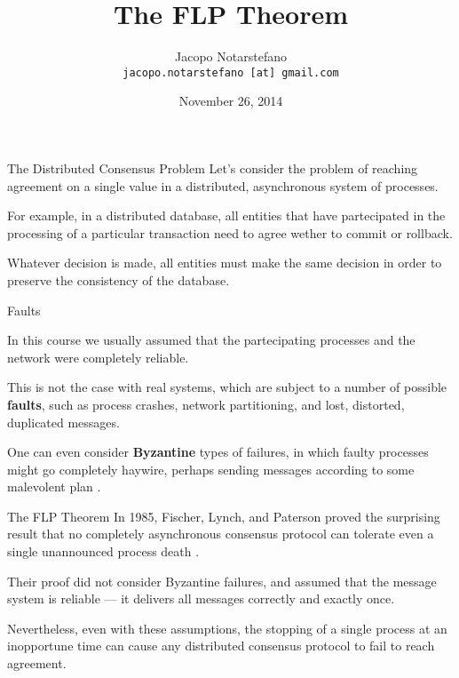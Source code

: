 \documentclass[12pt]{beamer}
\title{The FLP Theorem}
\author[Jacopo Notarstefano]{
  Jacopo Notarstefano\\
  \texttt{jacopo.notarstefano [at] gmail.com}
}
\date{November 26, 2014}
\begin{document}
  \begin{frame}[plain]
    \titlepage
  \end{frame}

  \begin{frame}{The Distributed Consensus Problem}
    Let's consider the problem of reaching agreement on a single value in a
    distributed, asynchronous system of processes.

    \vspace{0.25cm}

    For example, in a distributed database, all entities that have partecipated
    in the processing of a particular transaction need to agree wether to
    commit or rollback.

    \vspace{0.25cm}

    Whatever decision is made, all entities must make the same decision in
    order to preserve the consistency of the database.
  \end{frame}

  \begin{frame}{Faults}

    In this course we usually assumed that the partecipating processes and the
    network were completely reliable.

    \vspace{0.25cm}

    This is not the case with real systems, which are subject to a number of
    possible \textbf{faults}, such as process crashes, network partitioning,
    and lost, distorted, duplicated messages.

    \vspace{0.25cm}

    One can even consider \textbf{Byzantine} types of failures, in which faulty
    processes might go completely haywire, perhaps sending messages according
    to some malevolent plan \cite{LSP82}.
  \end{frame}

  \begin{frame}{The FLP Theorem}
    In 1985, Fischer, Lynch, and Paterson proved the surprising result that no
    completely asynchronous consensus protocol can tolerate even a single
    unannounced process death \cite{FLP85}.

    \vspace{0.25cm}

    Their proof did not consider Byzantine failures, and assumed that the
    message system is reliable — it delivers all messages correctly and exactly
    once.

    \vspace{0.25cm}

    Nevertheless, even with these assumptions, the stopping of a single process
    at an inopportune time can cause any distributed consensus protocol to fail
    to reach agreement.
  \end{frame}
\end{document}
